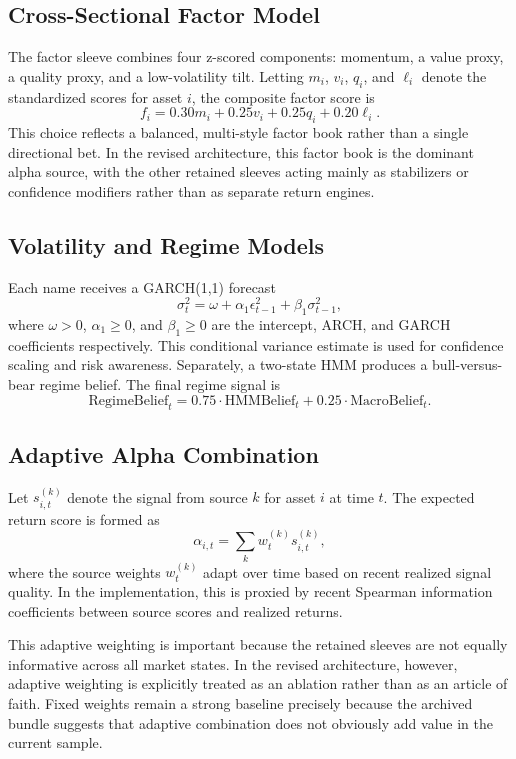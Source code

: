 \documentclass[10pt,twocolumn]{article}
\begin{document}
\subsection{Cross-Sectional Factor Model}

The factor sleeve combines four z-scored components: momentum, a value proxy, a
quality proxy, and a low-volatility tilt. Letting $m_i$, $v_i$, $q_i$, and
$\ell_i$ denote the standardized scores for asset $i$, the composite factor
score is
\[
f_i = 0.30 m_i + 0.25 v_i + 0.25 q_i + 0.20 \ell_i.
\]
This choice reflects a balanced, multi-style factor book rather than a single
directional bet. In the revised architecture, this factor book is the dominant
alpha source, with the other retained sleeves acting mainly as stabilizers or
confidence modifiers rather than as separate return engines.

\subsection{Volatility and Regime Models}

Each name receives a GARCH(1,1) forecast
\[
\sigma_t^2 = \omega + \alpha_1 \epsilon_{t-1}^2 + \beta_1 \sigma_{t-1}^2,
\]
where $\omega > 0$, $\alpha_1 \geq 0$, and $\beta_1 \geq 0$ are the intercept,
ARCH, and GARCH coefficients respectively. This conditional variance estimate
is used for confidence scaling and risk awareness. Separately, a two-state HMM
produces a bull-versus-bear regime belief. The final regime signal is
\[
\text{RegimeBelief}_t =
0.75 \cdot \text{HMMBelief}_t +
0.25 \cdot \text{MacroBelief}_t.
\]

\subsection{Adaptive Alpha Combination}

Let $s^{(k)}_{i,t}$ denote the signal from source $k$ for asset $i$ at time $t$.
The expected return score is formed as
\[
\alpha_{i,t} = \sum_k w^{(k)}_t s^{(k)}_{i,t},
\]
where the source weights $w^{(k)}_t$ adapt over time based on recent realized
signal quality. In the implementation, this is proxied by recent Spearman
information coefficients between source scores and realized returns.

This adaptive weighting is important because the retained sleeves are not
equally informative across all market states. In the revised architecture,
however, adaptive weighting is explicitly treated as an ablation rather than as
an article of faith. Fixed weights remain a strong baseline precisely because
the archived bundle suggests that adaptive combination does not obviously add
value in the current sample.
\end{document}
